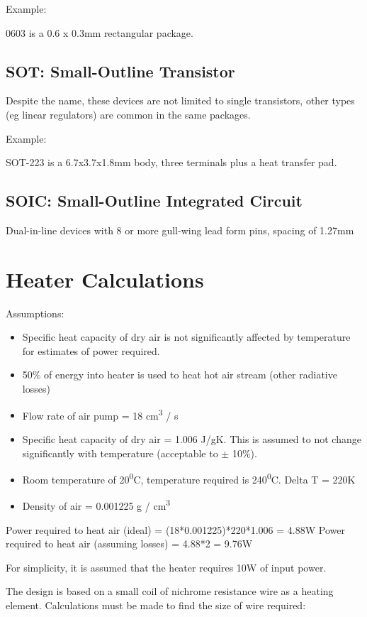 Example:

0603 is a 0.6 x 0.3mm rectangular package.

\subsection{SOT: Small-Outline Transistor}
Despite the name, these devices are not limited to single transistors, other types (eg linear regulators) are
common in the same packages.

Example:

SOT-223 is a 6.7x3.7x1.8mm body, three terminals plus a heat transfer pad.

\subsection{SOIC: Small-Outline Integrated Circuit}
Dual-in-line devices with 8 or more gull-wing lead form pins, spacing of 1.27mm

\newpage

\section{Heater Calculations}
\label{heatcalc}
Assumptions:
\begin{itemize} \itemsep0em
	\item Specific heat capacity of dry air is not significantly affected by temperature for estimates of power required.
	\item 50\% of energy into heater is used to heat hot air stream (other radiative losses)
	\item Flow rate of air pump = 18 cm\textsuperscript{3} / s
	\item Specific heat capacity of dry air = 1.006 J/gK. This is assumed to not change significantly with temperature (acceptable to $\pm$ 10\%).
	\item Room temperature of 20\textsuperscript{0}C, temperature required is 240\textsuperscript{0}C. Delta T = 220K
	\item Density of air = 0.001225 g / cm\textsuperscript{3}
\end{itemize}

Power required to heat air (ideal) = (18*0.001225)*220*1.006 = 4.88W
Power required to heat air (assuming losses) = 4.88*2 = 9.76W

For simplicity, it is assumed that the heater requires 10W of input power.

The design is based on a small coil of nichrome resistance wire as a heating element. Calculations must be made to find
the size of wire required:

